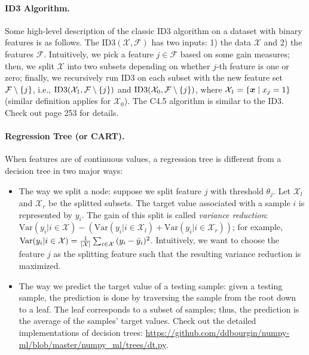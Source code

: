     \paragraph{ID3 Algorithm.} Some high-level description of the classic ID3 algorithm on a dataset with binary features is as follows.
    The $\text{ID3}(\mathcal{X}, \mathcal{F})$ has two inputs: 1) the data $\mathcal{X}$ and 2) the features $\mathcal{F}$.
    Intuitively, we pick a feature $j \in \mathcal{F}$ based on some gain measures; then, we split $\mathcal{X}$ into two subsets depending on whether $j$-th feature is one or zero; finally, we recursively run ID3 on each subset  with the new feature set $\mathcal{F} \setminus \{ j \}$, i.e., $\text{ID3}(\mathcal{X}_1, \mathcal{F} \setminus \{ j \})$ and $\text{ID3}(\mathcal{X}_0, \mathcal{F} \setminus \{ j \})$, where $\mathcal{X}_1 = \{ \bm{x} \mid x_j = 1 \}$ (similar definition applies for $\mathcal{X}_0$).
    The C4.5 algorithm is similar to the ID3. 
    Check out \cite{shalev2014understanding} page 253 for details. 

    \paragraph{Regression Tree (or CART).} 
    When features are of continuous values, a regression tree is different from a decision tree in two major ways:
        \begin{itemize}
            \item The way we split a node: suppose we split feature $j$ with threshold $\theta_j$.
            Let $\mathcal{X}_l$ and $\mathcal{X}_r$ be the splitted subsets. 
            The target value associated with a sample $i$ is represented by $y_i$.
            The gain of this split is called \emph{variance reduction}:
            $\text{Var}(y_i | i \in \mathcal{X}) - \left( \text{Var}(y_i | i \in \mathcal{X}_l) + \text{Var}(y_i | i \in \mathcal{X}_r) \right)$; for example, $\text{Var}(y_i | i \in \mathcal{X}) = \frac{1}{| \mathcal{X} |}\sum_{i \in \mathcal{X}}^{}{(y_i - \bar{y}_i)^2}$. Intuitively, we want to choose the feature $j$ as the splitting feature such that the resulting variance reduction is maximized.
            \item The way we predict the target value of a testing sample: given a testing sample, the prediction is done by traversing the sample from the root down to a leaf.
            The leaf corresponds to a subset of samples; thus, the prediction is the average of the samples' target values.
            Check out the detailed implementations of decision trees: \url{https://github.com/ddbourgin/numpy-ml/blob/master/numpy_ml/trees/dt.py}.
        \end{itemize}
    
